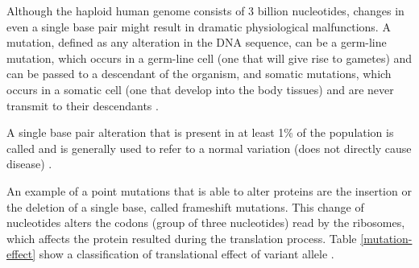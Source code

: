 Although the haploid human genome consists of 3 billion nucleotides,
changes in even a single base pair might result in dramatic physiological malfunctions.
A mutation, defined as any alteration in the DNA sequence,
can be a  germ-line mutation, which occurs in a germ-line cell
(one that will give rise to gametes) and
can be passed to a descendant of the organism, and somatic mutations,
which occurs in a somatic cell (one that develop into the body tissues) and
are never transmit to their descendants \cite{clancy2008genetic}.


 A single base pair alteration that is present in at least 1\% of the population
is called   and is generally used to refer to a
normal variation (does not directly cause disease) \cite{clancy2008genetic}.

An example of a point mutations that is able to  alter proteins are the insertion or the deletion of a single base, called frameshift mutations. This change of nucleotides alters the codons (group of three nucleotides) read by the ribosomes, which
 affects the protein resulted during the translation process. Table \ref{mutation-effect}
 show a classification of translational effect of variant allele \cite{GTAK_maf,maf}.

